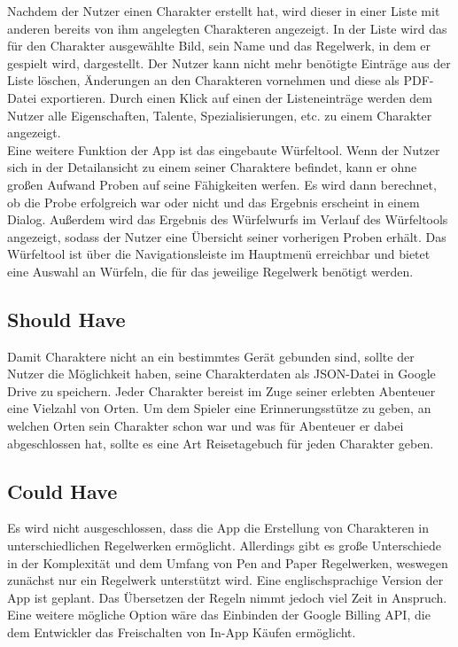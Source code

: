 Nachdem der Nutzer einen Charakter erstellt hat, wird dieser in einer Liste mit anderen bereits von ihm angelegten Charakteren angezeigt. In der Liste wird das für den Charakter ausgewählte Bild, sein Name und das Regelwerk, in dem er gespielt wird, dargestellt. Der Nutzer kann nicht mehr benötigte Einträge aus der Liste löschen, Änderungen an den Charakteren vornehmen und diese als PDF-Datei exportieren. Durch einen Klick auf einen der Listeneinträge werden dem Nutzer alle Eigenschaften, Talente, Spezialisierungen, etc. zu einem Charakter angezeigt.\\

Eine weitere Funktion der App ist das eingebaute Würfeltool. Wenn der Nutzer sich in der Detailansicht zu einem seiner Charaktere befindet, kann er ohne großen Aufwand Proben auf seine Fähigkeiten werfen. Es wird dann berechnet, ob die Probe erfolgreich war oder nicht und das Ergebnis erscheint in einem Dialog. Außerdem wird das Ergebnis des Würfelwurfs im Verlauf des Würfeltools angezeigt, sodass der Nutzer eine Übersicht seiner vorherigen Proben erhält. Das Würfeltool ist über die Navigationsleiste im Hauptmenü erreichbar und bietet eine Auswahl an Würfeln, die für das jeweilige Regelwerk benötigt werden.

\subsection{Should Have}
Damit Charaktere nicht an ein bestimmtes Gerät gebunden sind, sollte der Nutzer die Möglichkeit haben, seine Charakterdaten als JSON-Datei in Google Drive zu speichern. Jeder Charakter bereist im Zuge seiner erlebten Abenteuer eine Vielzahl von Orten. Um dem Spieler eine Erinnerungsstütze zu geben, an welchen Orten sein Charakter schon war und was für Abenteuer er dabei abgeschlossen hat, sollte es eine Art Reisetagebuch für jeden Charakter geben.

\subsection{Could Have}
Es wird nicht ausgeschlossen, dass die App die Erstellung von Charakteren in unterschiedlichen Regelwerken ermöglicht. Allerdings gibt es große Unterschiede in der Komplexität und dem Umfang von Pen and Paper Regelwerken, weswegen zunächst nur ein Regelwerk unterstützt wird. Eine englischsprachige Version der App ist geplant. Das Übersetzen der Regeln nimmt jedoch viel Zeit in Anspruch. Eine weitere mögliche Option wäre das Einbinden der Google Billing API, die dem Entwickler das Freischalten von In-App Käufen ermöglicht.

